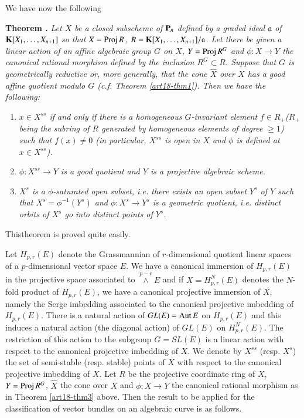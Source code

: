We have now the following

\medskip
\noindent
{\bf Theorem .\label{art18-thm3}}
{\em Let $X$ be a closed subscheme of $\mathbf{P}_{n}$ defined by a graded ideal $\mathfrak{a}$ of $\mathbf{K}[X_{1},\ldots,X_{n+1}]$ so that $X=\operatorname{\mathrm{Proj}} R$, $R=\mathbf{K}[X_{1},\ldots,X_{n+1}]/\mathfrak{a}$. Let there be given a linear action of an affine algebraic group $G$ on $X$, $Y=\operatorname{\mathrm{Proj}} R^{G}$ and $\phi:X\to Y$ the canonical rational morphism defined by the inclusion $R^{G}\subset R$. Suppose that $G$ is geometrically reductive or, more generally, that the cone $\widehat{X}$ over $X$ has a good affine quotient modulo $G$ (c.f. Theorem \ref{art18-thm1}). Then we have the following:}
\begin{enumerate}
\renewcommand{\labelenumi}{(\rm\theenumi)}
\itemsep=2pt
\item {\em $x\in X^{ss}$ if and only if there is a homogeneous $G$-invariant element $f\in R_{+}$($R_{+}$ being the subring of $R$ generated by homogeneous elements of degree $\geq 1$) such that $f(x)\neq 0$ (in particular, $X^{ss}$ is open in $X$ and $\phi$ is defined at $x\in X^{ss}$).}

\item {\em $\phi:X^{ss}\to Y$ is a good quotient and $Y$ is a projective algebraic scheme.}

\item {\em $X^{s}$ is a $\phi$-saturated open subset, i.e. there exists an open subset $Y^{s}$ of $Y$ such that $X^{s}=\phi^{-1}(Y^{s})$ and $\phi:X^{s}\to Y^{s}$ is a geometric quotient, i.e. distinct orbits of $X^{s}$ go into distinct points of $Y^{s}$.}
\end{enumerate}

This\pageoriginale theorem is proved quite easily.

Let $H_{p,r}(E)$ denote the Grassmannian of $r$-dimensional quotient linear spaces of a $p$-dimensional vector space $E$. We have a canonical immersion of $H_{p,r}(E)$ in the projective space associated to ${\displaystyle{\mathop{\wedge}\limits^{p-r}}}E$ and if $X=H^{N}_{p,r}(E)$ denotes the $N$-fold product of $H_{p,r}(E)$, we have a canonical projective immersion of $X$, namely the Serge imbedding associated to the canonical projective imbedding of $H_{p,r}(E)$. There is a natural action of $GL(E)=\operatorname{\mathrm{Aut}} E$ on $H_{p,r}(E)$ and this induces a natural action (the diagonal action) of $GL(E)$ on $H^{N}_{p,r}(E)$. The restriction of this action to the subgroup $G=SL(E)$ is a linear action with respect to the canonical projective imbedding of $X$. We denote by $X^{ss}$ (resp. $X^{s}$) the set of semi-stable (resp. stable) points of $X$ with respect to the canonical projective imbedding of $X$. Let $R$ be the projective coordinate ring of $X$, $Y=\operatorname{\mathrm{Proj}} R^{G}$, $\widehat{X}$ the cone over $X$ and $\phi:X\to Y$ the canonical rational morphism as in Theorem \ref{art18-thm3} above. Then the result to be applied for the classification of vector bundles on an algebraic curve is as follows.

